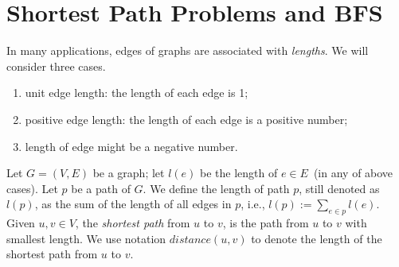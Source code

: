 \setcounter{definition}{0} \setcounter{property}{0} \setcounter{claim}{0} \setcounter{fact}{0} \setcounter{corollary}{0} \setcounter{figure}{0}
\section{Shortest Path Problems and BFS}

In many applications, edges of graphs are associated with \emph{lengths}.
We will consider three cases.
\vspace*{-\topsep}
\begin{enumerate}
\item unit edge length: the length of each edge is 1;
\item positive edge length: the length of each edge is a positive number;
\item length of edge might be a negative number.
\end{enumerate}

Let $G = (V, E)$ be a graph; let $l(e)$ be the length of $e\in E$~(in any of above cases).
Let $p$ be a path of $G$. We define the length of path $p$, still denoted as $l(p)$,
as the sum of the length of all edges in $p$, i.e., $l(p) := \sum_{e\in p} l(e)$.
Given $u,v\in V$, the \emph{shortest path} from $u$ to $v$, is the path from $u$ to $v$
with smallest length. We use notation $distance(u,v)$ to denote the length
of the shortest path from $u$ to $v$.


